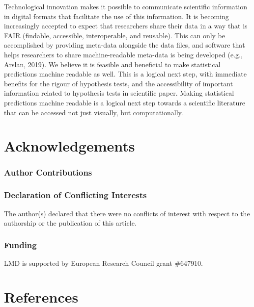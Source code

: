 \documentclass[doc,floatsintext]{apa6}
\begin{document}
Technological innovation makes it possible to communicate scientific information in digital formats that facilitate the use of this information. It is becoming increasingly accepted to expect that researchers share their data in a way that is FAIR (findable, accessible, interoperable, and reusable). This can only be accomplished by providing meta-data alongside the data files, and software that helps researchers to share machine-readable meta-data is being developed (e.g., Arslan, 2019). We believe it is feasible and beneficial to make statistical predictions machine readable as well. This is a logical next step, with immediate benefits for the rigour of hypothesis tests, and the accessibility of important information related to hypothesis tests in scientific paper. Making statistical predictions machine readable is a logical next step towards a scientific literature that can be accessed not just visually, but computationally.

\hypertarget{acknowledgements}{%
\section{Acknowledgements}\label{acknowledgements}}

\hypertarget{author-contributions}{%
\subsubsection{Author Contributions}\label{author-contributions}}

\hypertarget{declaration-of-conflicting-interests}{%
\subsubsection{Declaration of Conflicting Interests}\label{declaration-of-conflicting-interests}}

The author(s) declared that there were no conflicts of interest with respect to the authorship or the publication of this article.

\hypertarget{funding}{%
\subsubsection{Funding}\label{funding}}

LMD is supported by European Research Council grant \#647910.

\newpage

\hypertarget{references}{%
\section{References}\label{references}}
\end{document}
